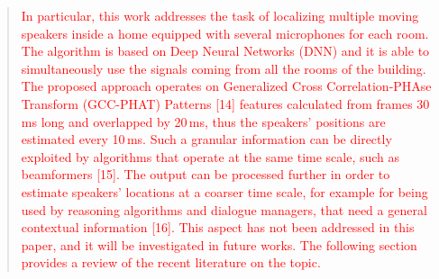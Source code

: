 \documentclass[11pt, technote, letterpaper, oneside, onecolumn]{IEEEtran}
\begin{document}
\begin{enumerate}
\begin{quote}
\textcolor{red}{
In particular, this work addresses the task of localizing multiple moving speakers inside a home equipped with several microphones for each room. The algorithm is based on Deep Neural Networks (DNN) and it is able to simultaneously use the signals coming from all the rooms of the building. The proposed approach operates on Generalized Cross Correlation-PHAse Transform (GCC-PHAT) Patterns [14] features calculated from frames 30\,ms long and overlapped by 20\,ms, thus the speakers' positions are estimated every 10\,ms. Such a granular information can be directly exploited by algorithms that operate at the same time scale, such as beamformers [15]. The output can be processed further in order to estimate speakers' locations at a coarser time scale, for example for being used by reasoning algorithms and dialogue managers, that need a general contextual information [16]. This aspect has not been addressed in this paper, and it will be investigated in future works. The following section provides a review of the recent literature on the topic.
}
\end{quote}


\end{enumerate}
\end{document}
